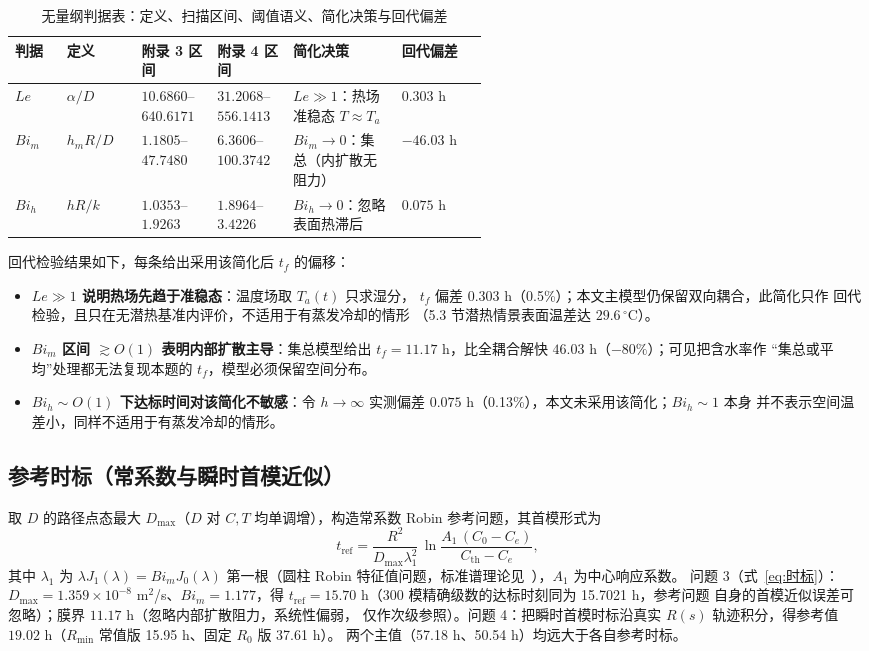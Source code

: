 \documentclass[12pt,a4paper]{ctexart}
\numberwithin{equation}{section}
\begin{document}
\begin{table}[htbp]
\centering
\caption{无量纲判据表：定义、扫描区间、阈值语义、简化决策与回代偏差}
\label{tab:判据族}
\small
\begin{tabular}{llp{0.16\linewidth}p{0.16\linewidth}p{0.23\linewidth}l}
\toprule
判据 & 定义 & 附录 3 区间 & 附录 4 区间 & 简化决策 & 回代偏差 \\
\midrule
$Le$ & $\alpha/D$ & $10.6860$--$640.6171$ & $31.2068$--$556.1413$ & $Le\gg1$：热场准稳态 $T\approx T_a$ & $0.303$ h \\
$Bi_m$ & $h_mR/D$ & $1.1805$--$47.7480$ & $6.3606$--$100.3742$ & $Bi_m\to0$：集总（内扩散无阻力） & $-46.03$ h \\
$Bi_h$ & $hR/k$ & $1.0353$--$1.9263$ & $1.8964$--$3.4226$ & $Bi_h\to0$：忽略表面热滞后 & $0.075$ h \\
\bottomrule
\end{tabular}
\end{table}

回代检验结果如下，每条给出采用该简化后 $t_f$ 的偏移：
\begin{itemize}
  \item \textbf{$Le\gg1$ 说明热场先趋于准稳态}：温度场取 $T_a(t)$ 只求湿分，
        $t_f$ 偏差 $0.303$ h（0.5\%）；本文主模型仍保留双向耦合，此简化只作
        回代检验，且只在无潜热基准内评价，不适用于有蒸发冷却的情形
        （5.3 节潜热情景表面温差达 $29.6\,^{\circ}$C）。
  \item \textbf{$Bi_m$ 区间 $\gtrsim O(1)$ 表明内部扩散主导}：集总模型给出
        $t_f=11.17$ h，比全耦合解快 $46.03$ h（$-80\%$）；可见把含水率作
        “集总或平均”处理都无法复现本题的 $t_f$，模型必须保留空间分布。
  \item \textbf{$Bi_h\sim O(1)$ 下达标时间对该简化不敏感}：令 $h\to\infty$
        实测偏差 $0.075$ h（0.13\%），本文未采用该简化；$Bi_h\sim1$ 本身
        并不表示空间温差小，同样不适用于有蒸发冷却的情形。
\end{itemize}

\subsection{参考时标（常系数与瞬时首模近似）}
取 $D$ 的路径点态最大 $D_{\max}$（$D$ 对 $C,T$ 均单调增），构造常系数 Robin
参考问题，其首模形式为
\begin{equation}
t_{\mathrm{ref}}=\frac{R^2}{D_{\max}\lambda_1^2}\,
\ln\!\frac{A_1\,(C_0-C_e)}{C_{\mathrm{th}}-C_e},
\label{eq:时标}
\end{equation}
其中 $\lambda_1$ 为 $\lambda J_1(\lambda)=Bi_m J_0(\lambda)$ 第一根（圆柱 Robin
特征值问题，标准谱理论见~\cite{crank}），$A_1$ 为中心响应系数。
问题 3（式~\eqref{eq:时标}）：$D_{\max}=1.359\times10^{-8}$ m$^2$/s、$Bi_m=1.177$，得
$t_{\mathrm{ref}}=15.70$ h（300 模精确级数的达标时刻同为 15.7021 h，参考问题
自身的首模近似误差可忽略）；膜界 $11.17$ h（忽略内部扩散阻力，系统性偏弱，
仅作次级参照）。问题 4：把瞬时首模时标沿真实 $R(s)$ 轨迹积分，得参考值
$19.02$ h（$R_{\min}$ 常值版 15.95 h、固定 $R_0$ 版 37.61 h）。
两个主值（57.18 h、50.54 h）均远大于各自参考时标。
\end{document}
